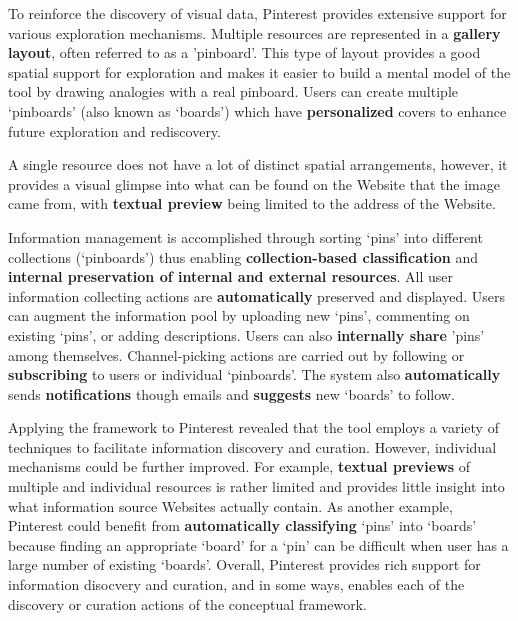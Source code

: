 \documentclass{sigchi}
\begin{document}
{To reinforce the discovery of visual data, Pinterest provides extensive support for various exploration mechanisms. Multiple resources are represented in a \textbf{gallery layout}, often referred to as a 'pinboard'. This type of layout provides a good spatial support for exploration and makes it easier to build a mental model of the tool by drawing analogies with a real pinboard. Users can create multiple `pinboards' (also known as `boards') which have \textbf{personalized} covers to enhance future exploration and rediscovery.

A single resource does not have a lot of distinct spatial arrangements, however, it provides a visual glimpse into what can be found on the Website that the image came from, with \textbf{textual preview} being limited to the address of the Website. 

Information management is accomplished through sorting `pins' into different collections (`pinboards') thus enabling \textbf{collection-based classification} and \textbf{internal preservation of internal and external resources}. All user information collecting actions are \textbf{automatically} preserved and displayed. Users can augment the information pool by uploading new `pins', commenting on existing `pins', or adding descriptions. Users can also \textbf{internally share} 'pins' among themselves. Channel-picking actions are carried out by following or \textbf{subscribing} to users or individual `pinboards'. The system also \textbf{automatically} sends \textbf{notifications} though emails and \textbf{suggests} new `boards' to follow.

Applying the framework to Pinterest revealed that the tool employs a  variety of techniques to facilitate information discovery and curation. However, individual mechanisms could be further improved. For example, \textbf{textual previews} of multiple and individual resources is rather limited and provides little insight into what information source Websites actually contain. As another example, Pinterest could benefit from \textbf{automatically classifying} `pins' into `boards' because finding an appropriate `board' for a `pin' can be difficult when user has a large number of existing `boards'. Overall, Pinterest provides rich support for information disocvery and curation, and in some ways, enables each of the discovery or curation actions of the conceptual framework. 
} %
\end{document}
